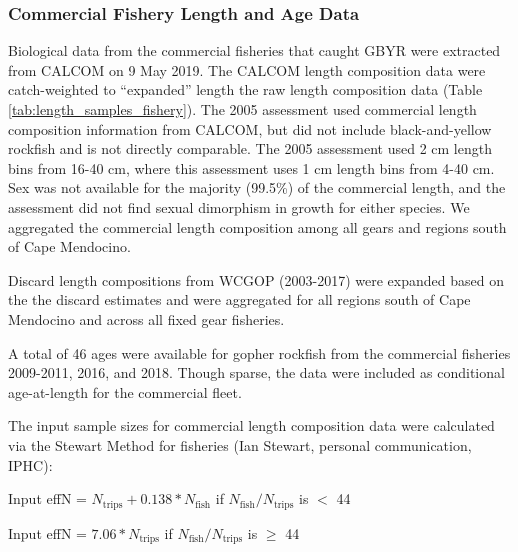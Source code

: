 \documentclass[12pt,]{article}
\begin{document}
\subsubsection{Commercial Fishery Length and Age
Data}\label{commercial-fishery-length-and-age-data}

Biological data from the commercial fisheries that caught GBYR were
extracted from CALCOM on 9 May 2019. The CALCOM length composition data
were catch-weighted to ``expanded'' length the raw length composition
data (Table \ref{tab:length_samples_fishery}). The 2005 assessment used
commercial length composition information from CALCOM, but did not
include black-and-yellow rockfish and is not directly comparable. The
2005 assessment used 2 cm length bins from 16-40 cm, where this
assessment uses 1 cm length bins from 4-40 cm. Sex was not available for
the majority (99.5\%) of the commercial length, and the assessment did
not find sexual dimorphism in growth for either species. We aggregated
the commercial length composition among all gears and regions south of
Cape Mendocino.

Discard length compositions from WCGOP (2003-2017) were expanded based
on the the discard estimates and were aggregated for all regions south
of Cape Mendocino and across all fixed gear fisheries.

A total of 46 ages were available for gopher rockfish from the
commercial fisheries 2009-2011, 2016, and 2018. Though sparse, the data
were included as conditional age-at-length for the commercial fleet.

The input sample sizes for commercial length composition data were
calculated via the Stewart Method for fisheries (Ian Stewart, personal
communication, IPHC):

\begin{center}

Input effN = $N_{\text{trips}} + 0.138 * N_{\text{fish}}$ if $N_{\text{fish}}/N_{\text{trips}}$ is $<$ 44

Input effN = $7.06 * N_{\text{trips}}$ if $N_{\text{fish}}/N_{\text{trips}}$ is $\geq$ 44

\end{center}
\end{document}
